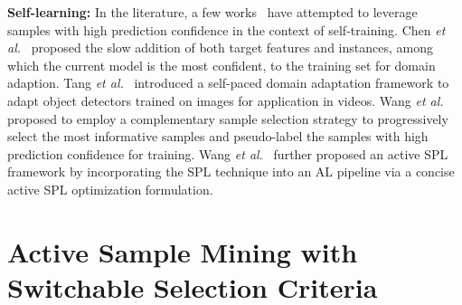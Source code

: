 \documentclass[journal]{IEEEtran}
\begin{document}
\textbf{Self-learning:} In the literature, a few works~\cite{ceal16tcsvt, aspl15TPAMI, NIPS2011_4433, NIPS2012_4691, McClosky, MSPLD,ssm18CVPR} have attempted to leverage samples with high prediction confidence in the context of self-training. 
Chen {\em et al.}~\cite{NIPS2011_4433} proposed the slow addition of both target features and instances, among which the current model is the most confident, to the training set for domain adaption. Tang {\em et al.}~\cite{NIPS2012_4691} introduced a self-paced domain adaptation framework to adapt object detectors trained on images for application {in} videos. Wang {\em et al.}~\cite{ceal16tcsvt} proposed to employ a complementary sample selection strategy to progressively select the most informative samples and pseudo-label the samples with high prediction confidence for training. Wang {\em et al.}~\cite{aspl15TPAMI} further proposed an active SPL framework by incorporating the SPL technique into an AL pipeline via a concise active SPL optimization formulation.   


 


\section{Active Sample Mining with Switchable Selection Criteria}
\label{sec:alg}
\end{document}
